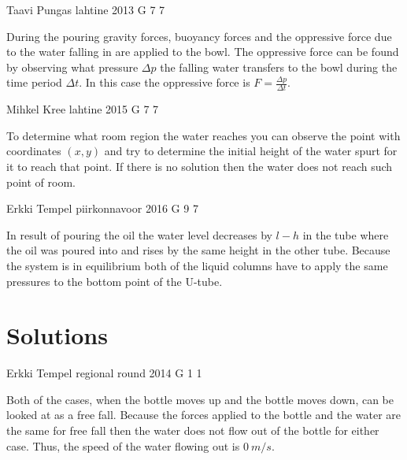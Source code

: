 \documentclass[11pt]{article}
\begin{document}
{Taavi Pungas} %
{lahtine} %
{2013} %
{G 7} %
{7} %
{

\ifEngHint
During the pouring gravity forces, buoyancy forces and the oppressive force due to the water falling in are applied to the bowl. The oppressive force can be found by observing what pressure $\Delta p$ the falling water transfers to the bowl during the time period $\Delta t$. In this case the oppressive force is $F = \frac{\Delta p}{\Delta t}$.
\fi
}

{Mihkel Kree} %
{lahtine} %
{2015} %
{G 7} %
{7} %
{

\ifEngHint
To determine what room region the water reaches you can observe the point with coordinates $(x, y)$ and try to determine the initial height of the water spurt for it to reach that point. If there is no solution then the water does not reach such point of room.
\fi
}

{Erkki Tempel} %
{piirkonnavoor} %
{2016} %
{G 9} %
{7} %
{

\ifEngHint
In result of pouring the oil the water level decreases by $l - h$ in the tube where the oil was poured into and rises by the same height in the other tube. Because the system is in equilibrium both of the liquid columns have to apply the same pressures to the bottom point of the U-tube.
\fi
}
\newpage\section{Solutions}
        \ToggleEngSolution
        
{Erkki Tempel} %
{regional round} %
{2014} %
{G 1} %
{1} %
{

\ifEngSolution
Both of the cases, when the bottle moves up and the bottle moves down, can be looked at as a free fall. Because the forces applied to the bottle and the water are the same for free fall then the water does not flow out of the bottle for either case. Thus, the speed of the water flowing out is $\SI{0}{m/s}$.
\fi
}
\end{document}
